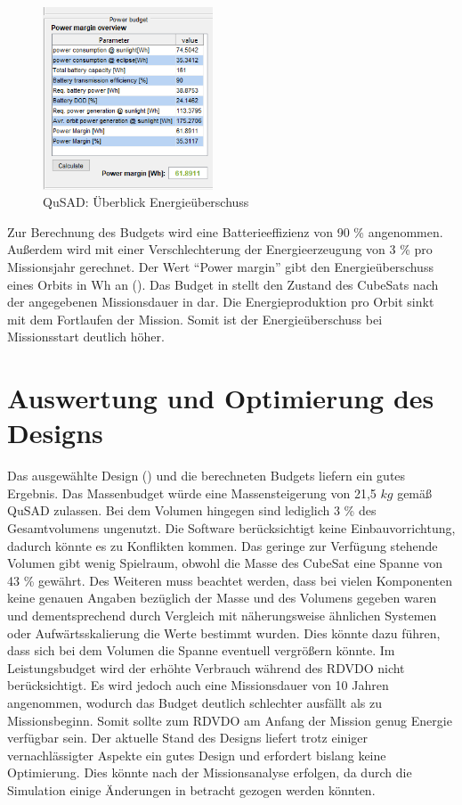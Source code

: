 			\begin{figure}[!h]
				\centering
					\includegraphics[width=0.45\textwidth]{graphics/power6.png}
				\caption{QuSAD: Überblick Energieüberschuss}
				\label{fig:power6}
			\end{figure}
Zur Berechnung des Budgets wird eine Batterieeffizienz von 90 \% angenommen. Außerdem wird mit einer Verschlechterung der Energieerzeugung von 3 \% pro Missionsjahr gerechnet. Der Wert “Power margin” gibt den Energieüberschuss eines Orbits in Wh an (). Das Budget in  stellt den Zustand des CubeSats nach der angegebenen Missionsdauer in  dar. Die Energieproduktion pro Orbit sinkt mit dem Fortlaufen der  Mission. Somit ist der Energieüberschuss bei Missionsstart deutlich höher. 			
			
			
			
			\section{Auswertung und Optimierung des Designs}
			Das ausgewählte Design () und die berechneten Budgets liefern ein gutes Ergebnis. Das Massenbudget würde eine Massensteigerung von 21,5 $kg$ gemäß QuSAD zulassen. Bei dem Volumen hingegen sind lediglich 3 \% des Gesamtvolumens ungenutzt. Die Software berücksichtigt keine Einbauvorrichtung, dadurch könnte es zu Konflikten kommen. Das geringe zur Verfügung stehende Volumen gibt wenig Spielraum, obwohl die Masse des CubeSat eine Spanne von 43 \% gewährt. Des Weiteren muss beachtet werden, dass bei vielen Komponenten keine genauen Angaben bezüglich der Masse und des Volumens gegeben waren und dementsprechend durch Vergleich mit näherungsweise ähnlichen Systemen oder Aufwärtsskalierung die Werte bestimmt wurden. Dies könnte dazu führen, dass sich bei dem Volumen die Spanne eventuell vergrößern könnte. Im Leistungsbudget wird der erhöhte Verbrauch während des RDVDO nicht berücksichtigt. Es wird jedoch auch eine Missionsdauer von 10 Jahren angenommen, wodurch das Budget deutlich schlechter ausfällt als zu Missionsbeginn. Somit sollte zum RDVDO am Anfang der Mission genug Energie verfügbar sein. Der aktuelle Stand des Designs liefert trotz einiger vernachlässigter Aspekte ein gutes Design und erfordert bislang keine Optimierung. Dies könnte nach der Missionsanalyse erfolgen, da durch die Simulation   einige Änderungen in betracht gezogen werden könnten.
